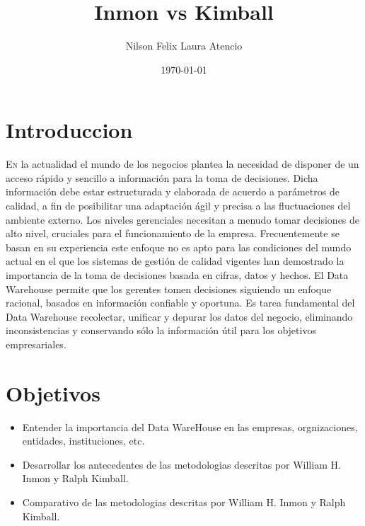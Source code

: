 \documentclass[twoside,twocolumn]{article}
\title{Inmon vs Kimball}
\author{Nilson Felix Laura Atencio\\
}
\date{\today}
\begin{document}
\maketitle


\section{Introduccion}
\lettrine[nindent=0em,lines=3]{E}n la actualidad el mundo de los negocios plantea la necesidad de disponer de un acceso rápido y sencillo a información para la toma de decisiones. Dicha información debe estar estructurada y elaborada de acuerdo a parámetros de calidad, a fin de posibilitar una adaptación ágil y precisa a las fluctuaciones del ambiente externo.
Los niveles gerenciales necesitan a menudo tomar decisiones de alto nivel, cruciales para el funcionamiento de la empresa. Frecuentemente se basan en su experiencia este enfoque no es apto para las condiciones del mundo actual en el que los sistemas de gestión de calidad vigentes han demostrado la importancia de la toma de decisiones basada en cifras, datos y hechos. El Data Warehouse permite que los gerentes tomen decisiones siguiendo un enfoque racional, basados en información confiable y oportuna. Es tarea fundamental del Data Warehouse recolectar, unificar y depurar los datos del negocio, eliminando inconsistencias y conservando sólo la información útil para los objetivos empresariales.





\section{Objetivos}

\begin{itemize}
\item Entender la importancia del Data WareHouse en las empresas, orgnizaciones, entidades, instituciones, etc.
\item Desarrollar los antecedentes de las metodologias descritas por William H. Inmon y Ralph Kimball.
\item Comparativo de las metodologias descritas por William H. Inmon y Ralph Kimball.

\end{itemize}
\end{document}
